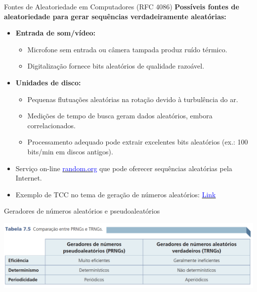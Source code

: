 \begin{frame}{Fontes de Aleatoriedade em Computadores (RFC 4086)}
\textbf{Possíveis fontes de aleatoriedade para gerar sequências verdadeiramente aleatórias:}

\begin{itemize}
    \item \textbf{Entrada de som/vídeo:} 
    \begin{itemize}
        \item Microfone sem entrada ou câmera tampada produz ruído térmico.
        \item Digitalização fornece bits aleatórios de qualidade razoável.
    \end{itemize}
    \item \textbf{Unidades de disco:}
    \begin{itemize}
        \item Pequenas flutuações aleatórias na rotação devido à turbulência do ar.
        \item Medições de tempo de busca geram dados aleatórios, embora correlacionados.
        \item Processamento adequado pode extrair excelentes bits aleatórios (ex.: 100 bits/min em discos antigos).
    \end{itemize}
    \item Serviço on-line \href{http://random.org}{\textcolor{blue}{random.org}} que pode oferecer sequências aleatórias pela Internet.

    \item Exemplo de TCC no tema de geração de números aleatórios: \href{https://lume.ufrgs.br/handle/10183/251751}{\textcolor{blue}{Link}}
\end{itemize}
\end{frame}


\begin{frame}{Geradores de números aleatórios e pseudoaleatórios}

\centering
\includegraphics[width=0.9\linewidth]{Figuras/tabelaprngtrng.png}


\end{frame}

